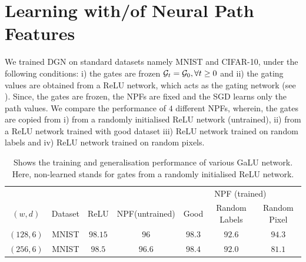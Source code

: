\section{Learning with/of Neural Path Features}

 We trained DGN on standard datasets namely MNIST and CIFAR-10, under the following conditions: i) the gates are frozen $\mathcal{G}_t=\mathcal{G}_0,\forall t\geq 0$ and ii) the gating values are obtained from a ReLU network, which acts as the gating network (see ). Since, the gates are frozen, the NPFs are fixed and the SGD learns only the path values. We compare the performance of $4$ different NPFs, wherein, the gates are copied from i) from a randomly initialised ReLU network (untrained), ii) from a ReLU network trained with good dataset iii) ReLU network trained on random labels and iv) ReLU network trained on random pixels.
\FloatBarrier
\begin{table}[h]
\begin{tabular}{|c|c|c|c|c|c|c|}\hline
&&&&\multicolumn{3}{c|}{NPF (trained)}\\\cline{5-7}
$(w,d)$	&Dataset		&ReLU		&NPF(untrained) 		&Good 		&Random Labels 	&Random Pixel\\\hline
$(128,6)$	& MNIST 		& $98.15$ 		&$96$ 		&$98.3$		&$92.6$			&$94.3$\\\hline
$(256,6)$	& MNIST 		& $98.5$ 		&$96.6$ 		&$98.4$		&$92.0$			&$81.1$\\\hline
\end{tabular}
\caption{Shows the training and generalisation performance of various GaLU network. Here, non-learned stands for gates from a randomly initialised ReLU network.}
\label{tb:npfs}
\end{table}
\FloatBarrier

